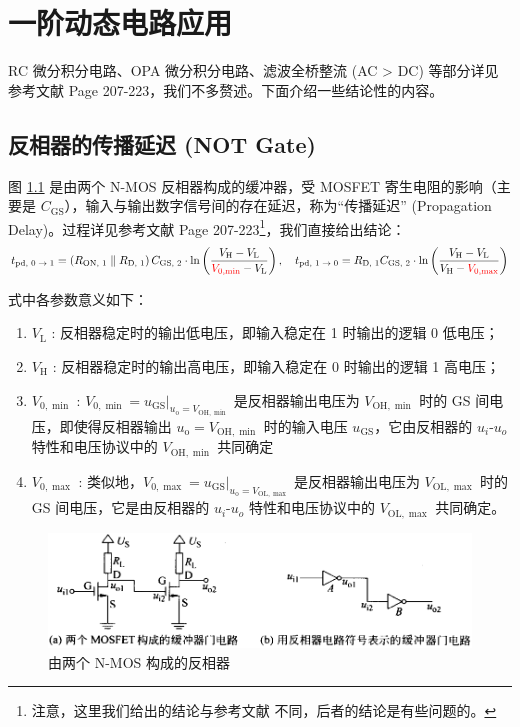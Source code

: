 \documentclass[UTF8]{report}
\theoremstyle{MyLineTheoremStyle} %
\theoremstyle{MyBlockTheoremStyle} %
\theoremstyle{MySubsubsectionStyle} %
\begin{document}
\section{一阶动态电路应用}
RC 微分积分电路、OPA 微分积分电路、滤波全桥整流 (AC > DC) 等部分详见参考文献 \cite{电路原理} Page 207-223，我们不多赘述。下面介绍一些结论性的内容。


\subsection{反相器的传播延迟 (NOT Gate)}

图 \ref{} 是由两个 N-MOS 反相器构成的缓冲器，受 MOSFET 寄生电阻的影响（主要是 $C_{\text{GS}}$），输入与输出数字信号间的存在延迟，称为“传播延迟” (Propagation Delay)。过程详见参考文献 \cite{电路原理} Page 207-223\footnote{注意，这里我们给出的结论与参考文献 \cite{电路原理} 不同，后者的结论是有些问题的。}，我们直接给出结论：
\begin{gather}
    t_\text{pd, $0\to 1$} = \left(R_{\text{ON, 1}} \parallel R_{\text{D, 1}}\right) C_{\text{GS, 2}}\cdot \ln \left(\frac{V_{\text{H}} - V_{\text{L}}}{{\color{red} V_{\text{0}, \min}} - V_{\text{L}}}\right)
    ,\quad 
    t_\text{pd, $1\to 0$} = R_{\text{D, 1}} C_{\text{GS, 2}}\cdot \ln \left(\frac{V_{\text{H}} - V_{\text{L}}}{V_{\text{H}} - {\color{red} V_{\text{0}, \max}}}\right)
\end{gather}

\noindent 式中各参数意义如下：
\begin{enumerate}
\item $V_\text{L}$ : 反相器稳定时的输出低电压，即输入稳定在 1 时输出的逻辑 0 低电压；
\item $V_\text{H}$ : 反相器稳定时的输出高电压，即输入稳定在 0 时输出的逻辑 1 高电压；
\item $V_{0,\min}$ : $V_{0,\min} = u_{\text{GS}}|_{u_{\text{o}} = V_{\text{OH}, \min}}$ 是反相器输出电压为 $V_{\text{OH},\min}$ 时的 GS 间电压，即使得反相器输出 $u_{\text{o}} = V_{\text{OH},\min}$ 时的输入电压 $u_{\text{GS}}$，它由反相器的 $u_i$-$u_o$ 特性和电压协议中的 $V_{\text{OH},\min}$ 共同确定
\item $V_{0,\max}$ : 类似地，$V_{0,\max} =  u_{\text{GS}}|_{u_{\text{o}} = V_{\text{OL}, \max}}$ 是反相器输出电压为 $V_{\text{OL},\max}$ 时的 GS 间电压，它是由反相器的 $u_i$-$u_o$ 特性和电压协议中的 $V_{\text{OL},\max}$ 共同确定。
\end{enumerate}

\begin{figure}[H]\centering
    \includegraphics[width=0.8\columnwidth]{assets/5/反相器的传播延迟.png}
    \caption{由两个 N-MOS 构成的反相器}\label{N-MOS 反相器}
\end{figure}
\end{document}
